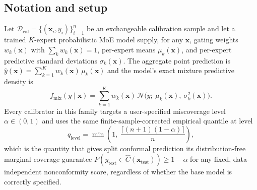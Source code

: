 \documentclass[10pt,twocolumn,a4paper]{article}
\begin{document}
\subsection{Notation and setup}
Let $\mathcal D_{\mathrm{cal}} = \{(\bm x_i, y_i)\}_{i=1}^n$ be an exchangeable calibration sample
and let a trained $K$-expert probabilistic MoE model supply, for any $\bm x$, gating weights
$w_k(\bm x)$ with $\sum_k w_k(\bm x)=1$, per-expert means $\mu_k(\bm x)$, and per-expert predictive
standard deviations $\sigma_k(\bm x)$. The aggregate point prediction is
$\hat y(\bm x) = \sum_{k=1}^K w_k(\bm x)\,\mu_k(\bm x)$ and the model's exact mixture predictive
density is
\begin{equation}
f_{\mathrm{mix}}(y\mid \bm x) = \sum_{k=1}^{K} w_k(\bm x)\, \mathcal N\big(y;\ \mu_k(\bm x),\ \sigma_k^2(\bm x)\big).
\label{eq:mix}
\end{equation}
Every calibrator in this family targets a user-specified miscoverage level $\alpha\in(0,1)$ and
uses the same finite-sample-corrected empirical quantile at level
\begin{equation}
q_{\mathrm{level}} = \min\!\left(1,\ \frac{\lceil (n+1)(1-\alpha)\rceil}{n}\right),
\label{eq:qlevel}
\end{equation}
which is the quantity that gives split conformal prediction its distribution-free marginal
coverage guarantee $P(y_{\mathrm{test}}\in\hat C(\bm x_{\mathrm{test}})) \ge 1-\alpha$ for any fixed,
data-independent nonconformity score, regardless of whether the base model is correctly specified.
\end{document}
